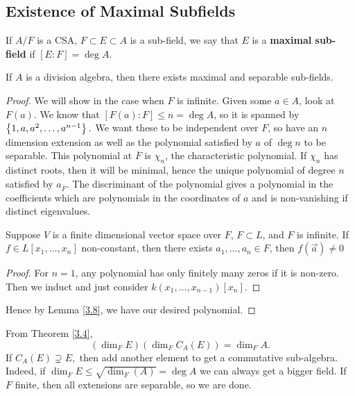 \subsection{Existence of Maximal Subfields}
\begin{defn}\label{3.6}
If $A/F$ is a CSA, $F \subset E \subset A$ is a sub-field, we say that $E$ is a \textbf{maximal sub-field} if $[E:F] = \deg A.$
\end{defn}
\begin{theorem}\label{3.7}
If $A$ is a division algebra, then there exists maximal and separable sub-fields. 
\end{theorem}
\begin{proof}
We will show in the case when $F$ is infinite. Given some $a \in A$, look at $F(a)$. We know that $[F(a):F] \leq n = \deg A$, so it is spanned by $\left\lbrace 1,a,a^2,\dots , a^{n-1} \right\rbrace.$ We want these to be independent over $F$, so have an $n$ dimension extension as well as the polynomial satisfied by $a$ of $\deg n$ to be separable. This polynomial at $\overline{F}$ is $\chi_n$, the characteristic polynomial. If $\chi_n$ has distinct roots, then it will be minimal, hence the unique polynomial of degree $n$ satisfied by $a_{\overline{F}}.$ The discriminant of the polynomial gives a polynomial in the coefficients which are polynomials in the coordinates of $a$ and is non-vanishing if distinct eigenvalues. 
\begin{lemma}\label{3.8}
Suppose $V$ is a finite dimensional vector space over $F$, $F \subset L$, and $F$ is infinite. If $f \in L[x_1,\dots ,x_n]$ non-constant, then there exists $a_1,\dots ,a_n \in F$, then $f(\overrightarrow{a}) \neq 0$
\end{lemma}
\begin{proof}
For $n=1$, any polynomial has only finitely many zeros if it is non-zero. Then we induct and just consider $k(x_1,\dots , x_{n-1})[x_n].$
\end{proof}
Hence by Lemma \ref{3.8}, we have our desired polynomial. 
\end{proof}
\begin{remark}\label{3.9}
From Theorem \ref{3.4}, 
$$(\dim_F E)(\dim_F C_A(E)) = \dim_F A .$$
If $C_A(E) \supsetneq E,$ then add another element to get a commutative sub-algebra. Indeed, if $\dim_F E \leq \sqrt{\dim_F(A)} = \deg A$ we can always get a bigger field. If $F$ finite, then all extensions are separable, so we are done.
\end{remark}


